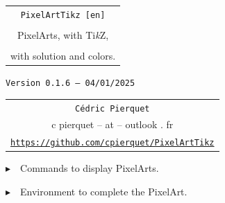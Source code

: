 \documentclass{article}
\def\TPversion{0.1.6}
\def\TPdate{04/01/2025}
\begin{document}
\pagestyle{fancy}

\thispagestyle{empty}

\vspace{2cm}

\begin{center}
	\begin{minipage}{0.75\linewidth}
	\begin{tcolorbox}[colframe=yellow,colback=yellow!15]
		\begin{center}
			\begin{tabular}{c}
				{\Huge \texttt{PixelArtTikz [en]}}\\
				\\
				{\LARGE PixelArts, with Ti\textit{k}Z}, \\
				\\
				{\LARGE with solution and colors.} \\
			\end{tabular}
			
			\medskip
			
			{\small \texttt{Version \TPversion{} -- \TPdate}}
		\end{center}
	\end{tcolorbox}
\end{minipage}
\end{center}

\vspace{0.5cm}

\begin{center}
	\begin{tabular}{c}
	\texttt{Cédric Pierquet}\\
	{\ttfamily c pierquet -- at -- outlook . fr}\\
	\texttt{\url{https://github.com/cpierquet/PixelArtTikz}}
\end{tabular}
\end{center}

\vspace{0.25cm}

{$\blacktriangleright$~~Commands to display PixelArts.}

\smallskip

{$\blacktriangleright$~~Environment to complete the PixelArt.}

\smallskip

\vspace{1cm}
\end{document}
